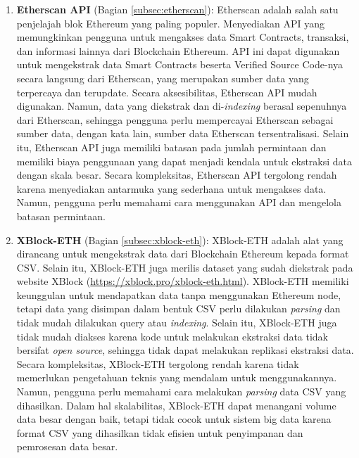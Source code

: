 \begin{enumerate}
    \item \textbf{Etherscan API} \parencite{etherscan2024} (Bagian \ref{subsec:etherscan}): Etherscan adalah salah satu penjelajah blok Ethereum yang paling populer. Menyediakan API yang memungkinkan pengguna untuk mengakses data Smart Contracts, transaksi, dan informasi lainnya dari Blockchain Ethereum. API ini dapat digunakan untuk mengekstrak data Smart Contracts beserta Verified Source Code-nya secara langsung dari Etherscan, yang merupakan sumber data yang terpercaya dan terupdate. Secara aksesibilitas, Etherscan API mudah digunakan. Namun, data yang diekstrak dan di-\textit{indexing} berasal sepenuhnya dari Etherscan, sehingga pengguna perlu mempercayai Etherscan sebagai sumber data, dengan kata lain, sumber data Etherscan tersentralisasi. Selain itu, Etherscan API juga memiliki batasan pada jumlah permintaan dan memiliki biaya penggunaan yang dapat menjadi kendala untuk ekstraksi data dengan skala besar. Secara kompleksitas, Etherscan API tergolong rendah karena menyediakan antarmuka yang sederhana untuk mengakses data. Namun, pengguna perlu memahami cara menggunakan API dan mengelola batasan permintaan.
    
    \item \textbf{XBlock-ETH} \parencite{zheng2020xblock} (Bagian \ref{subsec:xblock-eth}): XBlock-ETH adalah alat yang dirancang untuk mengekstrak data dari Blockchain Ethereum kepada format CSV. Selain itu, XBlock-ETH juga merilis dataset yang sudah diekstrak pada website XBlock (\url{https://xblock.pro/xblock-eth.html}). XBlock-ETH memiliki keunggulan untuk mendapatkan data tanpa menggunakan Ethereum node, tetapi data yang disimpan dalam bentuk CSV perlu dilakukan \textit{parsing} dan tidak mudah dilakukan query atau \textit{indexing}. Selain itu, XBlock-ETH juga tidak mudah diakses karena kode untuk melakukan ekstraksi data tidak bersifat \textit{open source}, sehingga tidak dapat melakukan replikasi ekstraksi data. Secara kompleksitas, XBlock-ETH tergolong rendah karena tidak memerlukan pengetahuan teknis yang mendalam untuk menggunakannya. Namun, pengguna perlu memahami cara melakukan \textit{parsing} data CSV yang dihasilkan. Dalam hal skalabilitas, XBlock-ETH dapat menangani volume data besar dengan baik, tetapi tidak cocok untuk sistem big data karena format CSV yang dihasilkan tidak efisien untuk penyimpanan dan pemrosesan data besar.
    

\end{enumerate}
